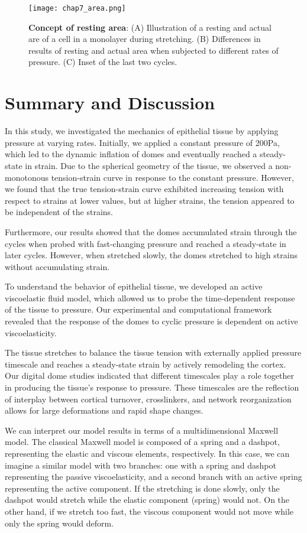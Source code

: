 \begin{figure}
	\centering
	\texttt{[image: chap7\_area.png]}
	\caption{\label{fig_7_7} \textbf{Concept of resting area}: (A) Illustration of a resting and actual are of a cell in a monolayer during stretching. (B) Differences in results of resting and actual area when subjected to different rates of pressure. (C) Inset of the last two cycles.
	}
\end{figure}

\hypertarget{summary}{%
	\section{Summary and Discussion}\label{summary}}

In this study, we investigated the mechanics of epithelial tissue by
applying pressure at varying rates. Initially, we applied a constant
pressure of 200Pa, which led to the dynamic inflation of domes and
eventually reached a steady-state in strain. Due to the spherical
geometry of the tissue, we observed a non-monotonous tension-strain
curve in response to the constant pressure. However, we found that the
true tension-strain curve exhibited increasing tension with respect to
strains at lower values, but at higher strains, the tension appeared to
be independent of the strains.

Furthermore, our results showed that the domes accumulated strain
through the cycles when probed with fast-changing pressure and reached a
steady-state in later cycles. However, when stretched slowly, the domes
stretched to high strains without accumulating strain.

To understand the behavior of epithelial tissue, we developed an active
viscoelastic fluid model, which allowed us to probe the time-dependent
response of the tissue to pressure. Our experimental and computational
framework revealed that the response of the domes to cyclic pressure is
dependent on active viscoelasticity.

The tissue stretches to balance the tissue tension with externally
applied pressure timescale and reaches a steady-state strain by actively
remodeling the cortex. Our digital dome studies indicated that different
timescales play a role together in producing the tissue's response to
pressure. These timescales are the reflection of interplay between
cortical turnover, crosslinkers, and network reorganization allows for
large deformations and rapid shape changes.

We can interpret our model results in terms of a multidimensional
Maxwell model. The classical Maxwell model is composed of a spring and a
dashpot, representing the elastic and viscous elements, respectively. In
this case, we can imagine a similar model with two branches: one with a
spring and dashpot representing the passive viscoelasticity, and a
second branch with an active spring representing the active component.
If the stretching is done slowly, only the dashpot would stretch while
the elastic component (spring) would not. On the other hand, if we
stretch too fast, the viscous component would not move while only the
spring would deform.

